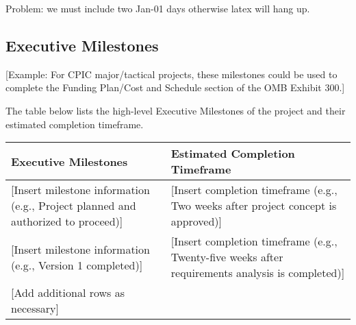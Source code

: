 \documentclass[a4paper, 11pt]{article}
\begin{document}

Problem: we must include two Jan-01 days otherwise latex will hang up.


\hypertarget{executive-milestones}{%
\subsection{Executive Milestones }\label{executive-milestones}}

{[}Example: For CPIC major/tactical projects, these milestones could be
used to complete the Funding Plan/Cost and Schedule section of the OMB
Exhibit 300.{]}

The table below lists the high-level Executive Milestones of the project
and their estimated completion timeframe.

\begin{longtable}[]{@{}ll@{}}
\toprule
\textbf{Executive Milestones} & \textbf{Estimated Completion Timeframe}\tabularnewline
\midrule
\endhead
{[}Insert milestone information (e.g., Project planned and authorized to
proceed){]} & {[}Insert completion timeframe (e.g., Two weeks after
project concept is approved){]}\tabularnewline
{[}Insert milestone information (e.g., Version 1 completed){]} &
{[}Insert completion timeframe (e.g., Twenty-five weeks after
requirements analysis is completed){]}\tabularnewline
{[}Add additional rows as necessary{]} &\tabularnewline
\bottomrule
\end{longtable}
\end{document}
